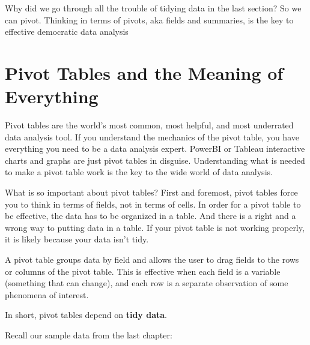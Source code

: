 \documentclass[]{book}
\newenvironment{Shaded}{\begin{snugshade}}{\end{snugshade}}
\newcommand{\CommentTok}[1]{\textcolor[rgb]{0.56,0.35,0.01}{\textit{#1}}}
\newcommand{\DataTypeTok}[1]{\textcolor[rgb]{0.13,0.29,0.53}{#1}}
\newcommand{\KeywordTok}[1]{\textcolor[rgb]{0.13,0.29,0.53}{\textbf{#1}}}
\newcommand{\NormalTok}[1]{#1}
\newcommand{\OperatorTok}[1]{\textcolor[rgb]{0.81,0.36,0.00}{\textbf{#1}}}
\newcommand{\StringTok}[1]{\textcolor[rgb]{0.31,0.60,0.02}{#1}}
\begin{document}
Why did we go through all the trouble of tidying data in the last section? So we can pivot. Thinking in terms of pivots, aka fields and summaries, is the key to effective democratic data analysis

\hypertarget{pivot-tables-and-the-meaning-of-everything}{%
\section{Pivot Tables and the Meaning of Everything}\label{pivot-tables-and-the-meaning-of-everything}}

Pivot tables are the world's most common, most helpful, and most underrated data analysis tool. If you understand the mechanics of the pivot table, you have everything you need to be a data analysis expert. PowerBI or Tableau interactive charts and graphs are just pivot tables in disguise. Understanding what is needed to make a pivot table work is the key to the wide world of data analysis.

What is so important about pivot tables? First and foremost, pivot tables force you to think in terms of fields, not in terms of cells. In order for a pivot table to be effective, the data has to be organized in a table. And there is a right and a wrong way to putting data in a table. If your pivot table is not working properly, it is likely because your data isn't tidy.

A pivot table groups data by field and allows the user to drag fields to the rows or columns of the pivot table. This is effective when each field is a variable (something that can change), and each row is a separate observation of some phenomena of interest.

In short, pivot tables depend on \textbf{tidy data}.

Recall our sample data from the last chapter:

\begin{Shaded}
\end{Shaded}
\end{document}
